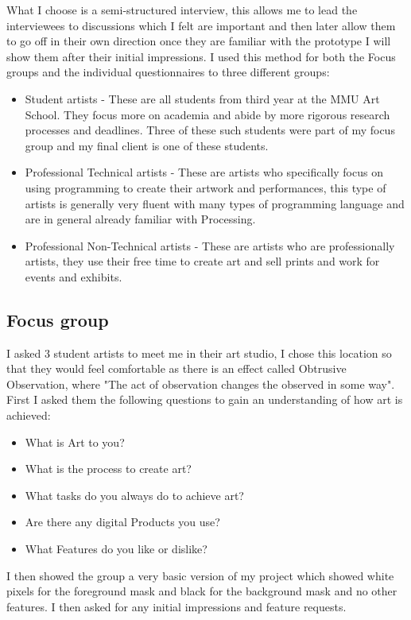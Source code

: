 \documentclass[a4paper]{report}
\begin{document}
What I choose is a semi-structured interview, this allows me to lead the interviewees to discussions which I felt are important and then later allow them to go off in their own direction once they are familiar with the prototype I will show them after their initial impressions. I used this method for both the Focus groups and the individual questionnaires to three different groups:

\begin{itemize}
\item Student artists - These are all students from third year at the MMU Art School. They focus more on academia and abide by more rigorous research processes and deadlines. Three of these such students were part of my focus group and my final client is one of these students.
\item Professional Technical artists - These are artists who specifically focus on using programming to create their artwork and performances, this type of artists is generally very fluent with many types of programming language and are in general already familiar with Processing\cite{PROCESSING}.
\item Professional Non-Technical artists - These are artists who are professionally artists, they use their free time to create art and sell prints and work for events and exhibits.
\end{itemize}

\subsection{Focus group}
I asked 3 student artists to meet me in their art studio, I chose this location so that they would feel comfortable as there is an effect called Obtrusive Observation, where "The act of observation changes the observed in some way"\cite{UX}. First I asked them the following questions to gain an understanding of how art is achieved:

\begin{itemize}
\item What is Art to you?
\item What is the process to create art?
\item What tasks do you always do to achieve art?
\item Are there any digital Products you use?
\item What Features do you like or dislike?
\end{itemize}

I then showed the group a very basic version of my project which showed white pixels for the foreground mask and black for the background mask and no other features. I then asked for any initial impressions and feature requests.
\end{document}
